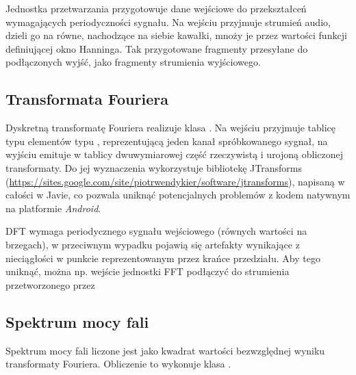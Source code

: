 Jednostka przetwarzania  przygotowuje dane wejściowe do przekształceń
wymagających periodyczności sygnału. Na wejściu przyjmuje strumień audio, dzieli go na równe,
nachodzące na siebie kawałki, mnoży je przez wartości funkcji definiującej okno Hanninga. Tak
przygotowane fragmenty przesyłane do podłączonych wyjść, jako fragmenty strumienia wyjściowego.


\subsection{Transformata Fouriera}

Dyskretną transformatę Fouriera realizuje klasa . Na wejściu przyjmuje tablicę typu
elementów typu , reprezentującą jeden kanał spróbkowanego sygnał, na wyjściu emituje w
tablicy dwuwymiarowej część rzeczywistą i urojoną obliczonej transformaty. Do jej wyznaczenia
wykorzystuje bibliotekę JTransforms
(\url{https://sites.google.com/site/piotrwendykier/software/jtransforms}), napisaną w całości w
Javie, co pozwala uniknąć potencjalnych problemów z kodem natywnym na platformie \emph{Android}.

\begin{Note}
  DFT wymaga periodycznego sygnału wejściowego (równych wartości na brzegach), w przeciwnym wypadku
  pojawią się artefakty wynikające z nieciągłości w punkcie reprezentowanym przez krańce przedziału.
  Aby tego uniknąć, można np. wejście jednostki FFT podłączyć do strumienia przetworzonego przez
\end{Note}


\subsection{Spektrum mocy fali}

Spektrum mocy fali liczone jest jako kwadrat wartości bezwzględnej wyniku transformaty Fouriera.
Obliczenie to wykonuje klasa .

